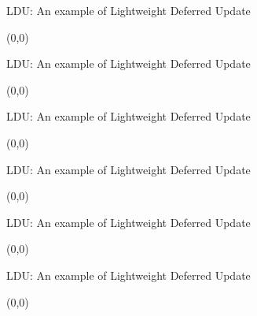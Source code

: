 \documentclass[english]{beamer} %
\begin{document}
\begin{frame}{LDU: An example of Lightweight Deferred Update}
\begin{textblock}{1}(0,0)
\end{textblock}
\end{frame}


\begin{frame}{LDU: An example of Lightweight Deferred Update}
\begin{textblock}{1}(0,0)
\end{textblock}
\end{frame}


\begin{frame}{LDU: An example of Lightweight Deferred Update}
\begin{textblock}{1}(0,0)
\end{textblock}
\end{frame}


\begin{frame}{LDU: An example of Lightweight Deferred Update}
\begin{textblock}{1}(0,0)
\end{textblock}
\end{frame}



\begin{frame}{LDU: An example of Lightweight Deferred Update}
\begin{textblock}{1}(0,0)
\end{textblock}
\end{frame}


\begin{frame}{LDU: An example of Lightweight Deferred Update}
\begin{textblock}{1}(0,0)
\end{textblock}
\end{frame}
\end{document}

